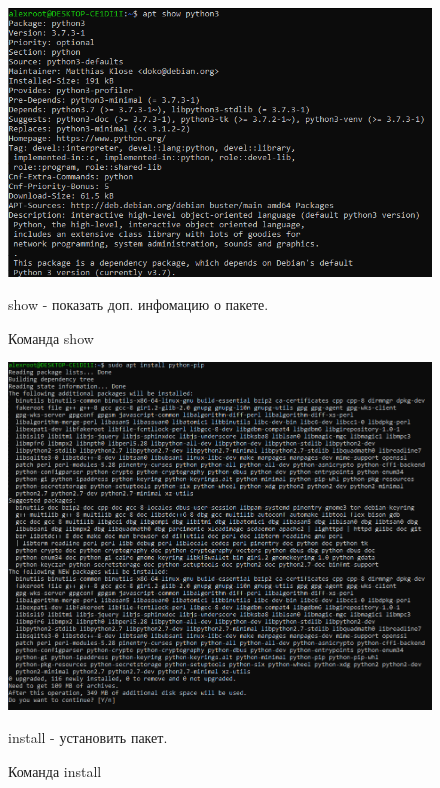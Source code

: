 \documentclass[a4paper,14pt]{extarticle}
\begin{document}
\begin{figure}[h!]
\centering
\includegraphics[width=0.8\linewidth]{show.png}
\caption{Команда show}
\label{fig:mpr}
show - показать доп. инфомацию о пакете. 
\end{figure}

\begin{figure}[h!]
\centering
\includegraphics[width=1\linewidth]{install.png}
\caption{Команда install}
\label{fig:mpr}
install - установить пакет. 
\end{figure}
\end{document}
